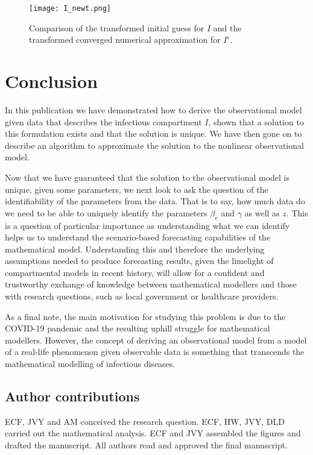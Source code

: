 \documentclass{article}
\newcommand{\be}{\beta_e}
\newcommand{\eps}{\varepsilon}
\begin{document}
\begin{figure}[!ht]
    \centering
    \texttt{[image: I\_newt.png]}
    \caption{Comparison of the transformed initial guess for $I$ and the transformed converged numerical approximation for $I^\eps$.}
    \label{fig_sim2}
\end{figure}

\section{Conclusion}
\label{conclusion} 
In this publication we have demonstrated how to derive the observational model given data that describes the infectious compartment $I$, shown that a solution to this formulation exists and that the solution is unique. We have then gone on to describe an algorithm to approximate the solution to the nonlinear observational model. 

Now that we have guaranteed that the solution to the observational model is unique, given some parameters, we next look to ask the question of the identifiability of the parameters from the data. That is to say, how much data do we need to be able to uniquely identify the parameters $\be$ and $\gamma$ as well as $z$. This is a question of particular importance as understanding what we can identify helps us to understand the scenario-based forecasting capabilities of the mathematical model. Understanding this and therefore the underlying assumptions needed to produce forecasting results, given the limelight of compartmental models in recent history, will allow for a confident and trustworthy exchange of knowledge between mathematical modellers and those with research questions, such as local government or healthcare providers. 

As a final note, the main motivation for studying this problem is due to the COVID-19 pandemic and the resulting uphill struggle for mathematical modellers. However, the concept of deriving an observational model from a model of a real-life phenomenon given observable data is something that transcends the mathematical modelling of infectious diseases.

\vskip6pt


\enlargethispage{20pt}


\subsection*{Author contributions}
{ECF, JVY and AM conceived the research question. ECF, HW, JVY, DLD carried out the mathematical analysis. ECF and JVY assembled the figures and drafted the manuscript. All authors read and approved the final manuscript.}
\end{document}

